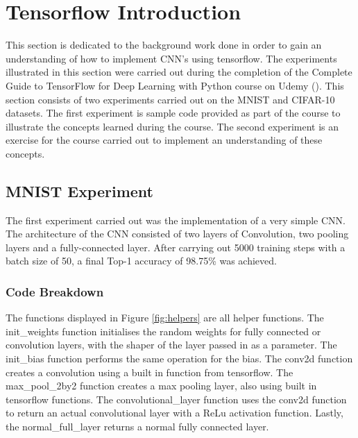 \documentclass[12pt]{report}
\begin{document}
\newpage
\section{Tensorflow Introduction}

This section is dedicated to the background work done in order to gain an understanding of how to implement CNN's using tensorflow. The experiments illustrated in this section were carried out during the completion of the Complete Guide to TensorFlow for Deep Learning with Python course on Udemy (\cite{udemy}). This section consists of two experiments carried out on the MNIST and CIFAR-10 datasets. The first experiment is sample code provided as part of the course to illustrate the concepts learned during the course. The second experiment is an exercise for the course carried out to implement an understanding of these concepts.

\subsection{MNIST Experiment}

The first experiment carried out was the implementation of a very simple CNN. The architecture of the CNN consisted of two layers of Convolution, two pooling layers and a fully-connected layer. After carrying out 5000 training steps with a batch size of 50, a final Top-1 accuracy of 98.75\% was achieved.

\subsubsection{Code Breakdown}

\begin{flushleft}
The functions displayed in Figure \ref{fig:helpers} are all helper functions. The init\_weights function initialises the random weights for fully connected or convolution layers, with the shaper of the layer passed in as a parameter. The init\_bias function performs the same operation for the bias. The conv2d function creates a convolution using a built in function from tensorflow. The max\_pool\_2by2 function creates a max pooling layer, also using built in tensorflow functions. The convolutional\_layer function uses the conv2d function to return an actual convolutional layer with a ReLu activation function. Lastly, the normal\_full\_layer returns a normal fully connected layer.
\end{flushleft}
\end{document}
